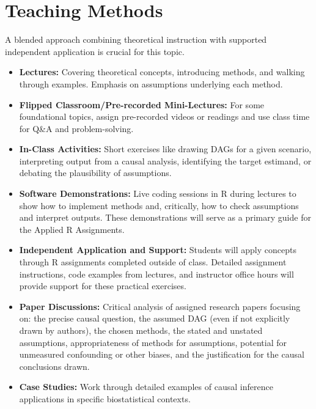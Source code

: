 \documentclass[10.5pt]{article}
\begin{document}
\section{Teaching Methods}
A blended approach combining theoretical instruction with supported independent application is crucial for this topic.
\begin{itemize}
    \item \textbf{Lectures:} Covering theoretical concepts, introducing methods, and walking through examples. Emphasis on assumptions underlying each method.
    \item \textbf{Flipped Classroom/Pre-recorded Mini-Lectures:} For some foundational topics, assign pre-recorded videos or readings and use class time for Q\&A and problem-solving.
    \item \textbf{In-Class Activities:} Short exercises like drawing DAGs for a given scenario, interpreting output from a causal analysis, identifying the target estimand, or debating the plausibility of assumptions.
    \item \textbf{Software Demonstrations:} Live coding sessions in R during lectures to show how to implement methods and, critically, how to check assumptions and interpret outputs. These demonstrations will serve as a primary guide for the Applied R Assignments.
    \item \textbf{Independent Application and Support:} Students will apply concepts through R assignments completed outside of class. Detailed assignment instructions, code examples from lectures, and instructor office hours will provide support for these practical exercises.
    \item \textbf{Paper Discussions:} Critical analysis of assigned research papers focusing on: the precise causal question, the assumed DAG (even if not explicitly drawn by authors), the chosen methods, the stated and unstated assumptions, appropriateness of methods for assumptions, potential for unmeasured confounding or other biases, and the justification for the causal conclusions drawn.
    \item \textbf{Case Studies:} Work through detailed examples of causal inference applications in specific biostatistical contexts.
\end{itemize}
\end{document}

